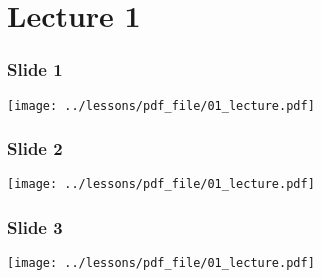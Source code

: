 \documentclass[../main/main.tex]{subfiles}
\begin{document}
\pagestyle{plain}

\section{Lecture 1}


\subsubsection*{Slide 1}

\begin{minipage}[]{0.5\linewidth}
\centering
\texttt{[image: ../lessons/pdf\_file/01\_lecture.pdf]}
\end{minipage}
\hspace{0.3cm}\vspace{0.3cm}
\begin{minipage}[c]{0.47\linewidth}

\end{minipage}

\subsubsection*{Slide 2}

\begin{minipage}[]{0.5\linewidth}
\centering
\texttt{[image: ../lessons/pdf\_file/01\_lecture.pdf]}
\end{minipage}
\hspace{0.3cm}\vspace{0.3cm}
\begin{minipage}[c]{0.47\linewidth}

\end{minipage}

\subsubsection*{Slide 3}

\begin{minipage}[]{0.5\linewidth}
\centering
\texttt{[image: ../lessons/pdf\_file/01\_lecture.pdf]}
\end{minipage}
\hspace{0.3cm}\vspace{0.3cm}
\begin{minipage}[c]{0.47\linewidth}

\end{minipage}

\newpage
\end{document}
